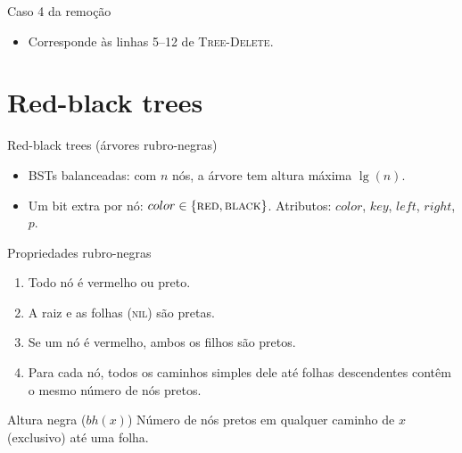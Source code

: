 \documentclass[aspectratio=169,10pt]{beamer}
\newcommand{\NIL}{\textnormal{\rmfamily\textsc{nil}}}
\newcommand{\RED}{\textnormal{\rmfamily\textsc{red}}}
\newcommand{\BLACK}{\textnormal{\rmfamily\textsc{black}}}
\newcommand{\proc}[1]{\textnormal{\rmfamily\textsc{#1}}}
\newcommand{\at}[1]{.\mathit{#1}}
\begin{document}
\begin{frame}{Caso 4 da remoção}
{\par}

  \vspace{1mm}
  \begin{itemize}
    \item Corresponde às linhas 5--12 de \proc{Tree-Delete}.
  \end{itemize}
\end{frame}

\section{Red-black trees}

\begin{frame}{Red-black trees (árvores rubro-negras)}
  \begin{itemize}
    \item BSTs \alert{balanceadas}: com $n$ nós, a árvore tem altura máxima $\lg(n)$.
    \item Um bit extra por nó: $color \in \{\RED, \BLACK\}$. Atributos: $color$, $key$,
          $left$, $right$, $p$.
  \end{itemize}
  \begin{block}{Propriedades rubro-negras}
    \begin{enumerate}
      \item Todo nó é vermelho ou preto.
      \item A raiz e as folhas (\NIL) são pretas.
      \item Se um nó é vermelho, ambos os filhos são pretos.
      \item Para cada nó, todos os caminhos simples dele até folhas descendentes contêm
            o mesmo número de nós pretos.
    \end{enumerate}
  \end{block}
  \begin{alertblock}{Altura negra ($bh(x)$)}
    Número de nós pretos em qualquer caminho de $x$ (exclusivo) até uma folha.
  \end{alertblock}
\end{frame}
\end{document}
